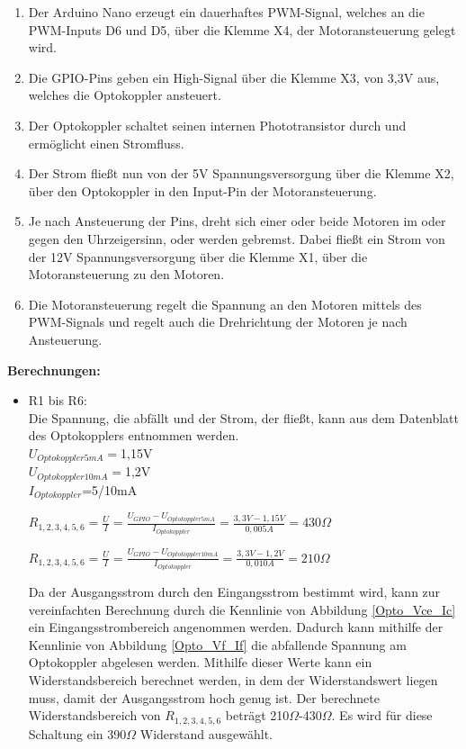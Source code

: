 \begin{enumerate}
\item Der Arduino Nano erzeugt ein dauerhaftes \ac{PWM}-Signal, welches an die \ac{PWM}-Inputs D6 und D5, über die Klemme X4, der Motoransteuerung gelegt wird.
\item Die GPIO-Pins geben ein High-Signal über die Klemme X3, von 3,3V aus, welches die Optokoppler ansteuert. 
\item Der Optokoppler schaltet seinen internen Phototransistor durch und ermöglicht einen Stromfluss.
\item Der Strom fließt nun von der 5V Spannungsversorgung über die Klemme X2, über den Optokoppler in den Input-Pin der Motoransteuerung.
\item Je nach Ansteuerung der Pins, dreht sich einer oder beide Motoren im oder gegen den Uhrzeigersinn, oder werden gebremst. Dabei fließt ein Strom von der 12V Spannungsversorgung über die Klemme X1, über die Motoransteuerung zu den Motoren.
\item Die Motoransteuerung regelt die Spannung an den Motoren mittels des \ac{PWM}-Signals und regelt auch die Drehrichtung der Motoren je nach Ansteuerung.
\end{enumerate}
\textbf{Berechnungen:}
\begin{itemize}
\item R1 bis R6: \\
Die Spannung, die abfällt und der Strom, der fließt, kann aus dem Datenblatt des Optokopplers entnommen werden.\\
$U_{Optokoppler 5mA}=$1,15V \\
$U_{Optokoppler 10mA}=$1,2V \\
$I_{Optokoppler}$=5/10mA \\

\begin{center}
$R_{1,2,3,4,5,6}=\frac{U}{I}=\frac{U_{GPIO}-U_{Optokoppler 5mA}}{I_{Optokoppler}}=\frac{3,3V-1,15V}{0,005A}=430\Omega$
\end{center}

\begin{center}
$R_{1,2,3,4,5,6}=\frac{U}{I}=\frac{U_{GPIO}-U_{Optokoppler 10mA}}{I_{Optokoppler}}=\frac{3,3V-1,2V}{0,010A}=210\Omega$
\end{center}

Da der Ausgangsstrom durch den Eingangsstrom bestimmt wird, kann zur vereinfachten Berechnung durch die Kennlinie von Abbildung \ref{Opto_Vce_Ic} ein Eingangsstrombereich angenommen werden. Dadurch kann mithilfe der Kennlinie von Abbildung \ref{Opto_Vf_If} die abfallende Spannung am Optokoppler abgelesen werden. Mithilfe dieser Werte kann ein Widerstandsbereich berechnet werden, in dem der Widerstandswert liegen muss, damit der Ausgangsstrom hoch genug ist. Der berechnete Widerstandsbereich von $R_{1,2,3,4,5,6}$ beträgt 210$\Omega$-430$\Omega$. Es wird für diese Schaltung ein 390$\Omega$ Widerstand ausgewählt.
\end{itemize}

